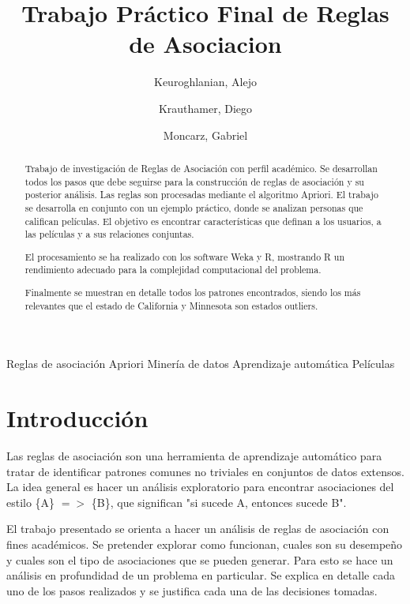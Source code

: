 \documentclass[journal]{IEEEtran}
\begin{document}
\title{Trabajo Práctico Final de Reglas de Asociacion}
\author{
	Keuroghlanian, Alejo \\
	\and
	Krauthamer, Diego \\
	\and
	Moncarz, Gabriel}
\maketitle %

\begin{abstract}
Trabajo de investigación de Reglas de Asociación con perfil académico. Se desarrollan
todos los pasos que debe seguirse para la construcción de reglas de asociación
y su posterior análisis. Las reglas son procesadas mediante el algoritmo Apriori.
El trabajo se desarrolla en conjunto con  un ejemplo
práctico, donde se analizan personas que califican películas. El objetivo es encontrar 
características que definan a los usuarios, a las películas y a sus
relaciones conjuntas. 

El procesamiento se ha realizado con los software
Weka y R, mostrando R un rendimiento
adecuado para la complejidad computacional del problema.

Finalmente se muestran en detalle todos los patrones encontrados, siendo los más
relevantes que el estado de California y Minnesota son estados outliers.
\end{abstract}

\begin{IEEEkeywords}
Reglas de asociación
Apriori
Minería de datos
Aprendizaje automática
Películas
\end{IEEEkeywords}







\section{Introducción}

Las reglas de asociación son una herramienta de aprendizaje automático para
tratar de identificar patrones comunes no triviales en conjuntos de datos
extensos. La idea general es hacer un análisis exploratorio para  encontrar 
asociaciones del estilo \{A\} $=$$>$ \{B\}, que significan 
"si sucede A, entonces sucede B". 

El trabajo presentado se orienta a hacer un análisis de reglas de asociación con
fines académicos. Se pretender explorar como funcionan, cuales son  su desempeño y
cuales son el tipo de asociaciones que se pueden generar. Para esto se
hace un análisis en profundidad de un problema en particular. Se
explica en detalle cada uno de los pasos realizados y se justifica cada una de 
las decisiones tomadas.
\end{document}
